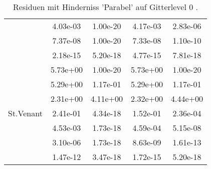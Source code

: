 \begin{table}
\begin{tabular}{c|cc|cc|}
\multicolumn{1}{|c|}{} & \multicolumn{1}{|c|}{  4.03e-03} & \multicolumn{1}{|c|}{  1.00e-20} & \multicolumn{1}{|c|}{  4.17e-03} & \multicolumn{1}{|c|}{  2.83e-06} \\ 
\multicolumn{1}{|c|}{} & \multicolumn{1}{|c|}{  7.37e-08} & \multicolumn{1}{|c|}{  1.00e-20} & \multicolumn{1}{|c|}{  7.33e-08} & \multicolumn{1}{|c|}{  1.10e-10} \\ 
\multicolumn{1}{|c|}{} & \multicolumn{1}{|c|}{  2.18e-15} & \multicolumn{1}{|c|}{  5.20e-18} & \multicolumn{1}{|c|}{  4.77e-15} & \multicolumn{1}{|c|}{  7.81e-18} \\ 
\hline 
\multicolumn{1}{|c|}{\multirow{7}{*}{St.Venant}} &\multicolumn{1}{|c|}{  5.73e+00} & \multicolumn{1}{|c|}{  1.00e-20} & \multicolumn{1}{|c|}{  5.73e+00} & \multicolumn{1}{|c|}{  1.00e-20} \\ 
\multicolumn{1}{|c|}{} & \multicolumn{1}{|c|}{  5.29e+00} & \multicolumn{1}{|c|}{  1.17e-01} & \multicolumn{1}{|c|}{  5.29e+00} & \multicolumn{1}{|c|}{  1.17e-01} \\ 
\multicolumn{1}{|c|}{} & \multicolumn{1}{|c|}{  2.31e+00} & \multicolumn{1}{|c|}{  4.11e+00} & \multicolumn{1}{|c|}{  2.32e+00} & \multicolumn{1}{|c|}{  4.44e+00} \\ 
\multicolumn{1}{|c|}{} & \multicolumn{1}{|c|}{  2.41e-01} & \multicolumn{1}{|c|}{  4.34e-18} & \multicolumn{1}{|c|}{  1.52e-01} & \multicolumn{1}{|c|}{  2.36e-04} \\ 
\multicolumn{1}{|c|}{} & \multicolumn{1}{|c|}{  4.53e-03} & \multicolumn{1}{|c|}{  1.73e-18} & \multicolumn{1}{|c|}{  4.59e-04} & \multicolumn{1}{|c|}{  5.15e-08} \\ 
\multicolumn{1}{|c|}{} & \multicolumn{1}{|c|}{  3.10e-06} & \multicolumn{1}{|c|}{  1.73e-18} & \multicolumn{1}{|c|}{  8.63e-09} & \multicolumn{1}{|c|}{  1.61e-13} \\ 
\multicolumn{1}{|c|}{} & \multicolumn{1}{|c|}{  1.47e-12} & \multicolumn{1}{|c|}{  3.47e-18} & \multicolumn{1}{|c|}{  1.72e-15} & \multicolumn{1}{|c|}{  5.20e-18} \\ 
\hline 
\end{tabular}\caption{Residuen mit Hinderniss 'Parabel' auf Gitterlevel 0 .}\label{tab:Residuum_Parabel_level0}
\end{table} 
